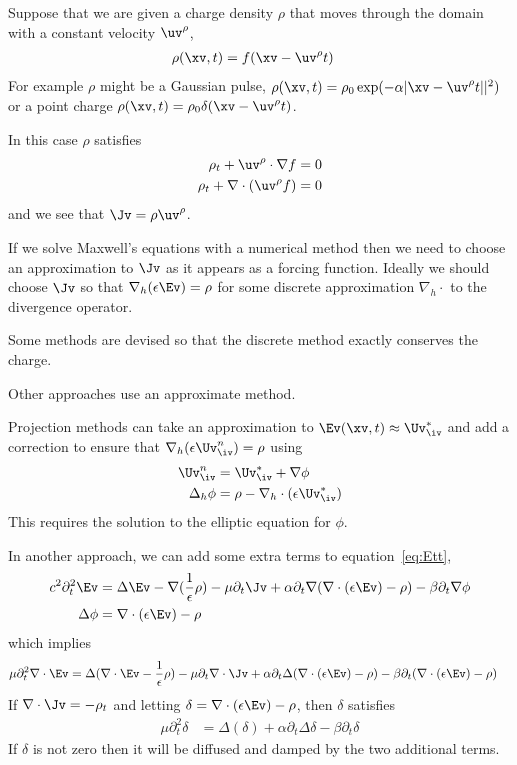 \documentclass[12pt]{article}
\newcommand{\grad}{\nabla}
\begin{document}
\newcommand{\uvc}{\uv^\rho}
Suppose that we are given a charge density $\rho$ that moves through the domain 
with a constant velocity $\uvc$, 
\begin{align}
  \rho(\xv,t) &= f(\xv-\uvc t)
\end{align}
For example $\rho$ might be a Gaussian pulse, 
$\rho(\xv,t)=\rho_0 \exp(-\alpha \vert \xv-\uvc t \vert|^2 )$
or a point charge $\rho(\xv,t)=\rho_0 \delta(\xv-\uvc t)$.

In this case $\rho$ satisfies
\begin{align}
  \rho_t + \uvc\cdot\grad f &=0 \\
  \rho_t + \grad\cdot( \uvc f ) &=0 
\end{align}
and we see that $\Jv=\rho\uvc$. 


If we solve Maxwell's equations with a numerical method then we need to choose an
approximation to $\Jv$ as it appears as a forcing function. Ideally we should choose
$\Jv$ so that $\grad_h(\eps\Ev)=\rho$ for some discrete approximation $\grad_h\cdot$
to the divergence operator. 

Some methods are devised so that the discrete method exactly conserves the charge.

Other approaches use an approximate method. 


Projection methods can take an approximation to $\Ev(\xv,t)\approx \Uv_\iv^*$ and
add a correction to ensure that $\grad_h(\eps\Uv_\iv^n)=\rho$ using
\begin{align}
  \Uv_\iv^n &= \Uv_\iv^* + \grad\phi  \\
  \Delta_h \phi &= \rho - \grad_h\cdot(\eps\Uv_\iv^*)
\end{align}
This requires the solution to the elliptic equation for $\phi$.


In another approach, we can add some extra terms to equation~\eqref{eq:Ett},
\begin{align}
 c^2\partial_t^2 \Ev &= \Delta \Ev  
                 -\grad(\frac{1}{\epsilon}\rho)- \mu \partial_t\Jv 
                 +\alpha \partial_t\grad( \grad\cdot(\eps\Ev)-\rho ) 
                 -\beta \partial_t\grad\phi \\
   \Delta \phi &= \grad\cdot(\eps\Ev)-\rho
\end{align}
which implies
\begin{align}
 \mu\partial_t^2 \grad\cdot\Ev &= \Delta(\grad\cdot\Ev-\frac{1}{\epsilon}\rho)
                 - \mu \partial_t\grad\cdot\Jv 
                 +\alpha \partial_t\Delta( \grad\cdot(\eps\Ev)-\rho ) 
                 -\beta \partial_t(\grad\cdot(\eps\Ev)-\rho)
\end{align}
If $\grad\cdot\Jv=-\rho_t$ and letting $\delta=\grad\cdot(\eps\Ev)-\rho$, then $\delta$
satisfies
\begin{align}
 \mu\partial_t^2 \delta &= \Delta(\delta)
                 +\alpha \partial_t\Delta \delta
                 -\beta \partial_t\delta
\end{align}
If $\delta$ is not zero then it will be diffused and damped by the two additional
terms.
\end{document}
